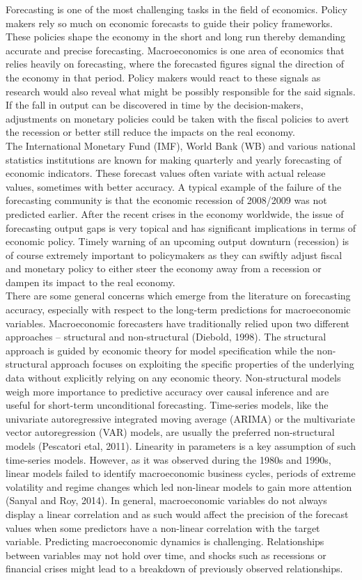 \documentclass[12pt,italian, twoside]{report}
\begin{document}
Forecasting is one of the most challenging tasks in the field of economics. Policy makers rely so much on economic forecasts to guide their policy frameworks. These policies shape the economy in the short and long run thereby demanding accurate and precise forecasting. Macroeconomics is one area of economics that relies heavily on forecasting, where the forecasted figures signal the direction of the economy in that period. Policy makers would react to these signals as research would also reveal what might be possibly responsible for the said signals. If the fall in output can be discovered in time by the decision-makers, adjustments on monetary policies could be taken with the fiscal policies to avert the recession or better still reduce the impacts on the real economy.
\\
The International Monetary Fund (IMF), World Bank (WB) and various national statistics institutions are known for making quarterly and yearly forecasting of economic indicators. These forecast values often variate with actual release values, sometimes with better accuracy. A typical example of the failure of the forecasting community is that the economic recession of 2008/2009 was not predicted earlier. After the recent crises in the economy worldwide, the issue of forecasting output gaps is very topical and has significant implications in terms of economic policy. Timely warning of an upcoming output downturn (recession) is of course extremely important to policymakers as they can swiftly adjust fiscal and monetary policy to either steer the economy away from a recession or dampen its impact to the real economy. \\ 
There are some general concerns which emerge from the literature on forecasting accuracy, especially with respect to the long-term predictions for macroeconomic variables. Macroeconomic forecasters have traditionally relied upon two different approaches – structural and non-structural (Diebold, 1998). The structural approach is guided by economic theory for model specification while the non-structural approach focuses on exploiting the specific properties of the underlying data without explicitly relying on any economic theory. Non-structural models weigh more importance to predictive accuracy over causal inference and are useful for short-term unconditional forecasting. Time-series models, like the univariate autoregressive integrated moving average (ARIMA) or the multivariate vector autoregression (VAR) models, are usually the preferred non-structural models (Pescatori etal, 2011). Linearity in parameters is a key assumption of such time-series models. However, as it was observed during the 1980s and 1990s, linear models failed to identify macroeconomic business cycles, periods of extreme volatility and regime changes which led non-linear models to gain more attention (Sanyal and Roy, 2014). In general, macroeconomic variables do not always display a linear correlation and as such would affect the precision of the forecast values when some predictors have a non-linear correlation with the target variable. Predicting macroeconomic dynamics is challenging. Relationships between variables may not hold over time, and shocks such as recessions or financial crises might lead to a breakdown of previously observed relationships.
\end{document}
